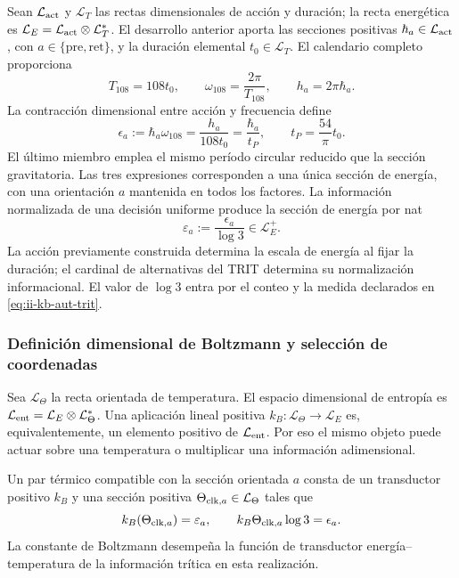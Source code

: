 Sean \(\mathcal L_{\rm act}\) y \(\mathcal L_T\) las rectas
dimensionales de acción y duración; la recta energética es
\(\mathcal L_E=\mathcal L_{\rm act}\otimes\mathcal L_T^*\).
El desarrollo anterior aporta las secciones positivas
\(\hbar_a\in\mathcal L_{\rm act}\), con
\(a\in\{\mathrm{pre},\mathrm{ret}\}\), y la duración elemental
\(t_0\in\mathcal L_T\). El calendario completo proporciona
\[
 T_{108}=108t_0,\qquad
 \omega_{108}=\frac{2\pi}{T_{108}},\qquad
 h_a=2\pi\hbar_a.
\]
La contracción dimensional entre acción y frecuencia define
\begin{equation}
 \epsilon_a:=\hbar_a\omega_{108}
 =\frac{h_a}{108t_0}
 =\frac{\hbar_a}{t_P},\qquad
 t_P=\frac{54}{\pi}t_0.
 \label{eq:ii-kb-aut-energia}
\end{equation}
El último miembro emplea el mismo período circular reducido que la
sección gravitatoria. Las tres expresiones corresponden a una única
sección de energía, con una orientación \(a\) mantenida en todos
los factores. La información normalizada de una decisión uniforme
produce la sección de energía por nat
\begin{equation}
 \varepsilon_a:=\frac{\epsilon_a}{\log3}\in\mathcal L_E^+.
 \label{eq:ii-kb-aut-energia-nat}
\end{equation}
La acción previamente construida determina la escala de energía al
fijar la duración; el cardinal de alternativas del TRIT determina su
normalización informacional. El valor de \(\log3\) entra por el
conteo y la medida declarados en \eqref{eq:ii-kb-aut-trit}.

\subsubsection{Definición dimensional de Boltzmann y selección de coordenadas}

Sea \(\mathcal L_\Theta\) la recta orientada de temperatura.
El espacio dimensional de entropía es
\(\mathcal L_{\rm ent}=\mathcal L_E\otimes\mathcal L_\Theta^*\).
Una aplicación lineal positiva
\(k_B:\mathcal L_\Theta\to\mathcal L_E\) es, equivalentemente,
un elemento positivo de \(\mathcal L_{\rm ent}\). Por eso el mismo
objeto puede actuar sobre una temperatura o multiplicar una información
adimensional.

\begin{definition}
Un par térmico compatible con la sección orientada \(a\) consta de
un transductor positivo \(k_B\) y una sección positiva
\(\Theta_{{\rm clk},a}\in\mathcal L_\Theta\) tales que
\begin{equation}
 k_B(\Theta_{{\rm clk},a})=\varepsilon_a,
 \qquad
 k_B\Theta_{{\rm clk},a}\log3=\epsilon_a.
 \label{eq:ii-kb-aut-par-termico}
\end{equation}
La constante de Boltzmann desempeña la función de transductor
energía--temperatura de la información trítica en esta realización.
\end{definition}

